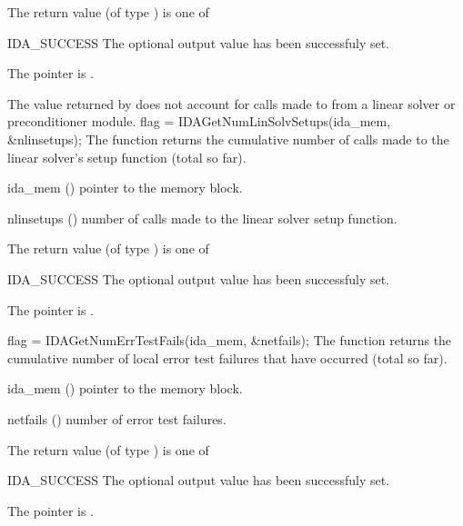 {{
  The return value  (of type ) is one of
  \begin{args}
  \item[IDA\_SUCCESS] 
    The optional output value has been successfuly set.
  \item[\Id{IDA\_MEM\_NULL}]
    The  pointer is .
  \end{args}
}
{
  The  value returned by  does not
  account for calls made to  from a linear solver or preconditioner 
  module. 
}
{
  flag = IDAGetNumLinSolvSetups(ida\_mem, \&nlinsetups);
}
{
  The function  returns the
  cumulative number of calls made to the linear solver's setup function 
  (total so far).
}
{
  \begin{args}[nlinsetups]
  \item[ida\_mem] ()
    pointer to the {\ida} memory block.
  \item[nlinsetups] ()
    number of calls made to the linear solver setup function.
  \end{args}
}
{
  The return value  (of type ) is one of
  \begin{args}
  \item[IDA\_SUCCESS] 
    The optional output value has been successfuly set.
  \item[\Id{IDA\_MEM\_NULL}]
    The  pointer is .
  \end{args}
}
{}
{
  flag = IDAGetNumErrTestFails(ida\_mem, \&netfails);
}
{
  The function  returns the
  cumulative number of local error test failures that have occurred 
  (total so far).
}
{
  \begin{args}[netfails]
  \item[ida\_mem] ()
    pointer to the {\ida} memory block.
  \item[netfails] ()
    number of error test failures.
  \end{args}
}
{
  The return value  (of type ) is one of
  \begin{args}
  \item[IDA\_SUCCESS] 
    The optional output value has been successfuly set.
  \item[\Id{IDA\_MEM\_NULL}]
    The  pointer is .
  \end{args}
}}
